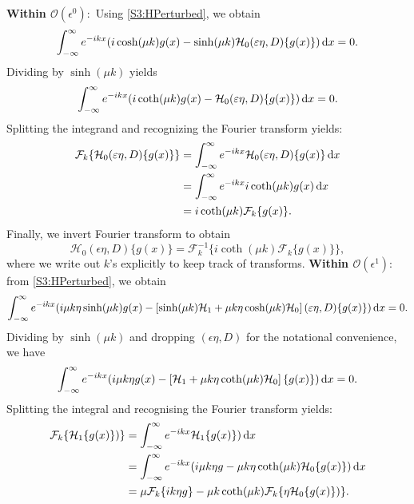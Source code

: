 \documentclass[11pt,reqno,oneside,a4paper]{article}
\begin{document}
\textbf{Within $\mathcal{O}(\epsilon^0):$} Using \eqref{S3:HPerturbed}, we obtain 
\begin{equation*}
\int_{-\infty}^{\infty} e^{-ikx}( i  \cosh(\mu k) g(x) - \sinh(\mu k) \mathcal{H}_0( \varepsilon \eta, D)\{ g(x) \}) \,\mathrm{d} x = 0.
\end{equation*}
Dividing by $\sinh(\mu k)$ yields 
\begin{equation*}
\int_{-\infty}^{\infty} e^{-ikx}( i  \coth(\mu k) g(x) - \mathcal{H}_0( \varepsilon \eta, D)\{ g(x) \}) \,\mathrm{d} x = 0.
\end{equation*}
Splitting the integrand and recognizing the Fourier transform yields:
\begin{align*}
\mathcal{F}_k\{\mathcal{H}_0( \varepsilon \eta, D)\{ g(x) \}\}&= \int_{-\infty}^{\infty} e^{-ikx}\mathcal{H}_0( \varepsilon \eta, D)\{ g(x) \} \,\mathrm{d} x\\
&= \int_{-\infty}^{\infty} e^{-ikx} i \coth(\mu k) g(x) \,\mathrm{d} x \\
&= i \coth(\mu k) \mathcal{F}_k\{g(x)\}.
\end{align*}
Finally, we invert Fourier transform to obtain 
\begin{equation}\label{S3:H0}
\mathcal{H}_0( \epsilon \eta, D)\{ g(x) \} =\mathcal{F}^{-1}_k\{i \coth(\mu k) \mathcal{F}_k\{g(x)\} \},
\end{equation}
where we write out $k$'s explicitly to keep track of transforms. 
\newline \textbf{Within $\mathcal{O}(\epsilon^1):$} from \eqref{S3:HPerturbed}, we obtain
\begin{align*}
\int_{-\infty}^{\infty} e^{-ikx}( i \mu k \eta \sinh(\mu k) g(x) - \left[ \sinh(\mu k)\mathcal{H}_1 + \mu k \eta \cosh(\mu k) \mathcal{H}_0 \right]( \varepsilon \eta, D)\{ g(x) \}) \,\mathrm{d} x = 0.
\end{align*}
Dividing by $\sinh(\mu k)$ and dropping $( \epsilon \eta, D)$ for the notational convenience, we have 
\begin{align*}
\int_{-\infty}^{\infty} e^{-ikx}( i \mu k \eta g(x) - \left[\mathcal{H}_1 + \mu k \eta \coth(\mu k) \mathcal{H}_0 \right]\{ g(x) \}) \,\mathrm{d} x = 0.
\end{align*}
Splitting the integral and recognising the Fourier transform yields:
\begin{align*}
\mathcal{F}_k \{\mathcal{H}_1 \{ g(x) \})\} &= \int_{-\infty}^{\infty} e^{-ikx}  \mathcal{H}_1 \{ g(x) \}) \,\mathrm{d} x \\
&= \int_{-\infty}^{\infty} e^{-ikx}( i \mu k \eta g  - \mu k \eta \coth(\mu k) \mathcal{H}_0 \{ g(x) \}) \,\mathrm{d} x \\
&= \mu \mathcal{F}_k \{ i k \eta g \} - \mu k \coth(\mu k) \mathcal{F}_k\{ \eta \mathcal{H}_0 \{ g(x) \}) \}.
\end{align*}
\end{document}

